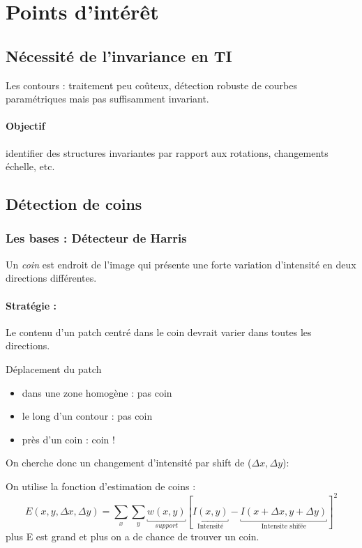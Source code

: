 \documentclass[main.tex]{subfiles}
\begin{document}
\section{Points d'intérêt}

\subsection{Nécessité de l'invariance en TI}

Les contours : traitement peu coûteux, détection robuste de courbes paramétriques mais pas suffisamment invariant.

\paragraph{Objectif} identifier des structures invariantes par rapport aux rotations, changements échelle, etc.

\subsection{Détection de coins}
\subsubsection{Les bases : Détecteur de Harris}
\begin{defin}
Un \emph{coin} est endroit de l'image qui présente une forte variation d'intensité en deux directions différentes.
\end{defin}

\paragraph{Stratégie : } Le contenu d'un patch centré dans le coin  devrait varier dans toutes les directions.

Déplacement du patch
\begin{itemize}
\item dans une zone homogène : pas coin
\item le long d'un contour : pas coin
\item près d'un coin  : coin !
\end{itemize}

On cherche donc un changement d'intensité par shift de ($\Delta x,\Delta y$):
\begin{defin}
  On utilise la fonction d'estimation de coins :
  \[
    E(x,y,\Delta x,\Delta y) = \sum_{x}^{}\sum_{y}^{}\underbracket{w(x,y)}_{support}\left[ \underbracket{I(x,y)}_{\text{Intensité}}-\underbracket{I(x+\Delta x,y+\Delta y)}_{\text{Intensite shifée}} \right]^2
  \]
  plus E est grand et plus on a de chance de trouver un coin.
\end{defin}
\end{document}
